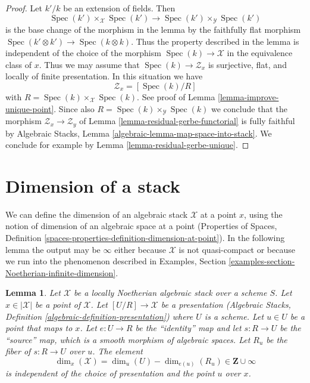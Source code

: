 \documentclass{stacks-project}
\theoremstyle{plain}
\newtheorem{lemma}[subsection]{Lemma}
\theoremstyle{definition}
\theoremstyle{remark}
\numberwithin{equation}{subsection}
\def\Spec{\mathop{\mathrm{Spec}}}
\begin{document}
\begin{proof}
Let $k'/k$ be an extension of fields. Then
$$
\Spec(k') \times_\mathcal{X} \Spec(k')
\longrightarrow
\Spec(k') \times_\mathcal{Y} \Spec(k')
$$
is the base change of the morphism in the lemma by the
faithfully flat morphism $\Spec(k' \otimes k') \to \Spec(k \otimes k)$.
Thus the property described in the lemma is independent of the
choice of the morphism $\Spec(k) \to \mathcal{X}$ in the
equivalence class of $x$. Thus we may assume that
$\Spec(k) \to \mathcal{Z}_x$ is surjective, flat, and
locally of finite presentation. In this situation we have
$$
\mathcal{Z}_x = [\Spec(k)/R]
$$
with $R = \Spec(k) \times_\mathcal{X} \Spec(k)$. See
proof of Lemma \ref{lemma-improve-unique-point}.
Since also $R = \Spec(k) \times_\mathcal{Y} \Spec(k)$
we conclude that the morphism $\mathcal{Z}_x \to \mathcal{Z}_y$
of Lemma \ref{lemma-residual-gerbe-functorial}
is fully faithful by
Algebraic Stacks, Lemma \ref{algebraic-lemma-map-space-into-stack}.
We conclude for example by Lemma \ref{lemma-residual-gerbe-unique}.
\end{proof}








\section{Dimension of a stack}
\label{section-dimension}

\noindent
We can define the dimension of an algebraic stack $\mathcal{X}$
at a point $x$, using the notion of dimension of an algebraic space
at a point (Properties of Spaces, Definition
\ref{spaces-properties-definition-dimension-at-point}).
In the following lemma the output may be $\infty$ either because
$\mathcal{X}$ is not quasi-compact or because we run into the
phenomenon described in Examples, Section
\ref{examples-section-Noetherian-infinite-dimension}.

\begin{lemma}
\label{lemma-dimension-at-point-well-defined}
Let $\mathcal{X}$ be a locally Noetherian algebraic stack over a scheme $S$.
Let $x \in |\mathcal{X}|$ be a point of $\mathcal{X}$.
Let $[U/R] \to \mathcal{X}$ be a presentation
(Algebraic Stacks, Definition \ref{algebraic-definition-presentation})
where $U$ is a scheme. Let $u \in U$ be a point that maps to $x$.
Let $e : U \to R$ be the ``identity'' map and let $s : R \to U$ be the
``source'' map, which is a smooth morphism of algebraic spaces. Let $R_u$
be the fiber of $s : R \to U$ over $u$. The element
$$
\dim_x(\mathcal{X}) = \dim_u(U) - \dim_{e(u)}(R_u) \in \mathbf{Z} \cup \infty
$$
is independent of the choice of presentation and the point $u$ over $x$.
\end{lemma}
\end{document}

